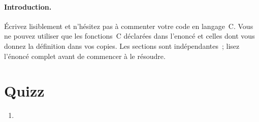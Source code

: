 \documentclass[ds]{sujet}
\begin{document}
\formation{} 
\matiere{}  
\auteur{} 
\def\SujetClsNumero{}
\paragraph{Introduction.}
\'Ecrivez lisiblement et n'h\'esitez pas \`a commenter votre code en
langage~C. 
Vous ne pouvez utiliser que les fonctions~C  d\'eclar\'ees
dans l'enonc\'e et celles dont vous donnez la d\'efinition dans vos copies.
Les sections sont ind\'ependantes~; lisez l'\'enonc\'e
complet avant de commencer \`a le r\'esoudre.
\section{Quizz}
\begin{enumerate}
\item
\end{enumerate}


\end{document}
